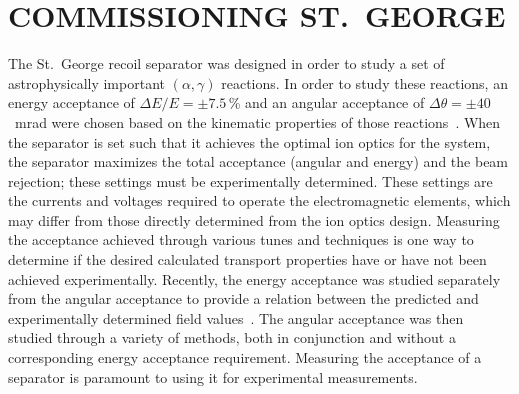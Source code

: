 \chapter{COMMISSIONING ST.\ GEORGE}

The St.\ George recoil separator was designed in order to study a set of
astrophysically important $(\alpha,\gamma)$ reactions. In order to study these
reactions, an energy acceptance of $\Delta E/E = \pm7.5$\,\% and an angular
acceptance of $\Delta\theta = \pm40$~mrad were chosen based on the kinematic
properties of those reactions~\cite{Couder2008}. When the separator is set
such that it achieves the optimal ion optics for the system, the separator
maximizes the total acceptance (angular and energy) and the beam rejection;
these settings must be experimentally determined. These settings are the
currents and voltages required to operate the electromagnetic elements, which
may differ from those directly determined from the ion optics design.
Measuring the acceptance achieved through various tunes and techniques is one
way to determine if the desired calculated transport properties have or have
not been achieved experimentally. Recently, the energy acceptance was studied
separately from the angular acceptance to provide a relation between the
predicted and experimentally determined field values~\cite{Meisel2017}. The
angular acceptance was then studied through a variety of methods, both in
conjunction and without a corresponding energy acceptance requirement.
Measuring the acceptance of a separator is paramount to using it for
experimental measurements.

